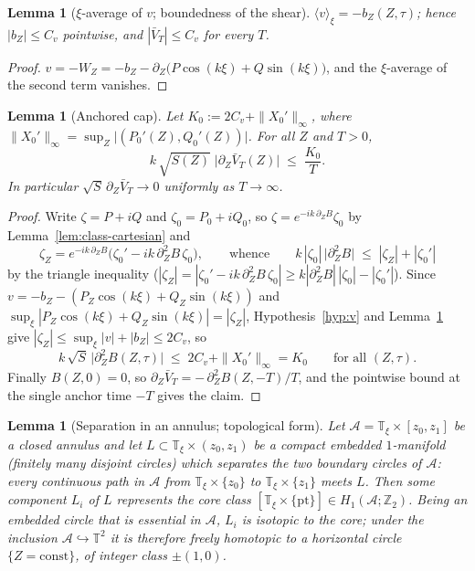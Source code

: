 \documentclass[11pt]{amsart}
\newtheorem{lemma}[theorem]{Lemma}
\theoremstyle{definition}
\theoremstyle{remark}
\newcommand{\T}{\mathbb{T}}
\newcommand{\ZZmod}{\mathbb{Z}_2}
\newcommand{\mean}[1]{\langle #1\rangle}
\begin{document}
\begin{lemma}[$\xi$-average of $v$; boundedness of the shear]
\label{lem:vmean}
$\mean{v}_\xi=-b_Z(Z,\tau)$; hence $|b_Z|\le C_v$ pointwise, and
$|\bar V_T|\le C_v$ for every $T$.
\end{lemma}

\begin{proof}
$v=-W_Z=-b_Z-\partial_Z\bigl(P\cos(k\xi)+Q\sin(k\xi)\bigr)$, and the
$\xi$-average of the second term vanishes.
\end{proof}

\begin{lemma}[Anchored cap]\label{lem:anchor}
Let $K_0:=2C_v+\|X_0'\|_\infty$, where
$\|X_0'\|_\infty=\sup_Z\bigl|(P_0'(Z),Q_0'(Z))\bigr|$. For all $Z$ and
$T>0$,
\[
  k\,\sqrt{S(Z)}\;\bigl|\partial_Z\bar V_T(Z)\bigr|
  \;\le\;\frac{K_0}{T}.
\]
In particular $\sqrt S\,\partial_Z\bar V_T\to0$ uniformly as
$T\to\infty$.
\end{lemma}

\begin{proof}
Write $\zeta=P+iQ$ and $\zeta_0=P_0+iQ_0$, so
$\zeta=e^{-ik\,\partial_ZB}\zeta_0$ by
Lemma~\ref{lem:class-cartesian} and
\[
  \zeta_Z=e^{-ik\,\partial_ZB}
  \bigl(\zeta_0'-ik\,\partial_Z^2B\,\zeta_0\bigr),
  \qquad\text{whence}\qquad
  k\,|\zeta_0|\,\bigl|\partial_Z^2B\bigr|
  \;\le\;|\zeta_Z|+|\zeta_0'|
\]
by the triangle inequality
($|\zeta_Z|=|\zeta_0'-ik\,\partial_Z^2B\,\zeta_0|
\ge k|\partial_Z^2B|\,|\zeta_0|-|\zeta_0'|$). Since
$v=-b_Z-(P_Z\cos(k\xi)+Q_Z\sin(k\xi))$ and
$\sup_\xi|P_Z\cos(k\xi)+Q_Z\sin(k\xi)|=|\zeta_Z|$,
Hypothesis~\ref{hyp:v} and Lemma~\ref{lem:vmean} give
$|\zeta_Z|\le\sup_\xi|v|+|b_Z|\le2C_v$, so
\[
  k\,\sqrt{S}\,\bigl|\partial_Z^2B(Z,\tau)\bigr|
  \;\le\;2C_v+\|X_0'\|_\infty=K_0
  \qquad\text{for all }(Z,\tau) .
\]
Finally $B(Z,0)=0$, so
$\partial_Z\bar V_T=-\,\partial_Z^2B(Z,-T)/T$, and the pointwise bound
at the single anchor time $-T$ gives the claim.
\end{proof}

\begin{lemma}[Separation in an annulus; topological form]
\label{lem:annulus-top}
Let $\mathcal A=\T_\xi\times[z_0,z_1]$ be a closed annulus and let
$L\subset\T_\xi\times(z_0,z_1)$ be a compact embedded $1$-manifold
(finitely many disjoint circles) which \emph{separates} the two boundary
circles of $\mathcal A$: every continuous path in $\mathcal A$ from
$\T_\xi\times\{z_0\}$ to $\T_\xi\times\{z_1\}$ meets $L$. Then some
component $L_i$ of $L$ represents the core class
$[\T_\xi\times\{\mathrm{pt}\}]\in H_1(\mathcal A;\ZZmod)$. Being an
embedded circle that is essential in $\mathcal A$, $L_i$ is isotopic to
the core; under the inclusion $\mathcal A\hookrightarrow\T^2$ it is
therefore freely homotopic to a horizontal circle $\{Z=\mathrm{const}\}$,
of integer class $\pm(1,0)$.
\end{lemma}
\end{document}
